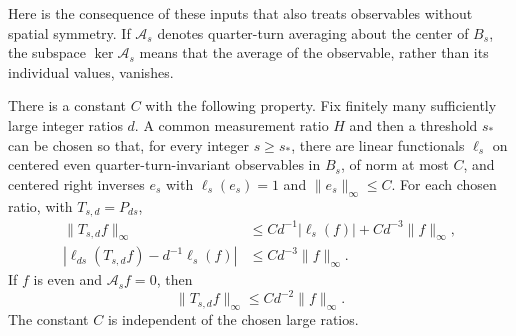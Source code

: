 Here is the consequence of these inputs that also treats observables without
spatial symmetry.  If $\mathcal A_s$ denotes quarter-turn averaging about the
center of $B_s$, the subspace $\ker\mathcal A_s$ means that the average of
the observable, rather than its individual values, vanishes.

\begin{lemma}
\label{pure:fixed-ratio}
There is a constant $C$ with the following property.  Fix finitely many
sufficiently large integer ratios $d$.  A common measurement ratio $H$ and
then a threshold $s_*$ can be chosen so that, for every integer $s\geq s_*$,
there are linear functionals $\ell_s$ on centered even
quarter-turn-invariant observables in $B_s$, of norm at most $C$, and
centered right inverses $e_s$ with $\ell_s(e_s)=1$ and $\|e_s\|_\infty\leq C$.
For each chosen ratio, with $T_{s,d}=P_{ds}$,
\begin{align}
 \|T_{s,d}f\|_\infty
   &\leq C d^{-1}|\ell_s(f)|+C d^{-3}\|f\|_\infty,
       \label{pure:ratio-main}\\
 |\ell_{ds}(T_{s,d}f)-d^{-1}\ell_s(f)|
   &\leq C d^{-3}\|f\|_\infty.
       \label{pure:ratio-coefficient}
\end{align}
If $f$ is even and $\mathcal A_s f=0$, then
\begin{equation}
 \|T_{s,d}f\|_\infty\leq C d^{-2}\|f\|_\infty.
 \label{pure:ratio-nonscalar}
\end{equation}
The constant $C$ is independent of the chosen large ratios.
\end{lemma}

